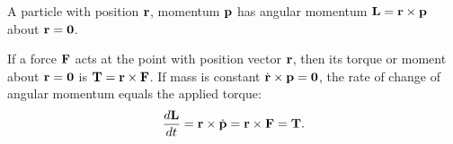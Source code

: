 \documentclass[10pt, a4paper]{article}
\begin{document}
A particle with position $\mathbf{r}$,
momentum $\mathbf{p}$ has angular momentum $\mathbf{L} = \mathbf{r} \times \mathbf{p}$ about $\mathbf{r} = \mathbf{0}$.

If a force $\mathbf{F}$ acts at the point with position vector $\mathbf{r}$,
then its torque or moment about $\mathbf{r} = \mathbf{0}$ is $\mathbf{T} = \mathbf{r} \times \mathbf{F}$.
If mass is constant $\dot{\mathbf{r}} \times \mathbf{p} = \mathbf{0}$,
the rate of change of angular momentum equals the applied torque:
\[
\frac{d\mathbf{L}}{dt} = \mathbf{r} \times \dot{\mathbf{p}} = \mathbf{r} \times \mathbf{F} = \mathbf{T}.
\]
\end{document}
